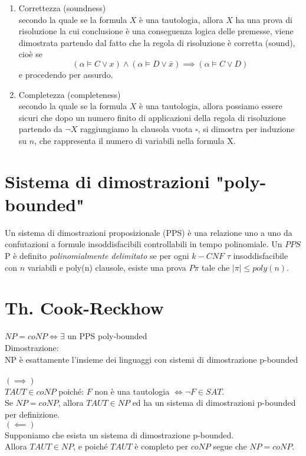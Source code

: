 \documentclass[it]{article}
\begin{document}
        \begin{enumerate}
            \item Correttezza (soundness)\\
            secondo la quale se la formula $ {\displaystyle X} $ è una tautologia, allora $ {\displaystyle X} $ ha una prova di risoluzione la cui conclusione è una conseguenza logica delle premesse, viene dimostrata partendo dal fatto che la regola di risoluzione è corretta (sound), cioè se
            $$ (\alpha \models C \lor x) \land (\alpha \models D \lor \bar{x}) \implies (\alpha \models C \lor D) $$
            e procedendo per assurdo.
            \item Completezza (completeness)\\
            secondo la quale se la formula $ {\displaystyle X} $ è una tautologia, allora possiamo essere sicuri che dopo un numero finito di applicazioni della regola di risoluzione partendo da $\lnot X$ raggiungiamo la clausola vuota $\square$, si dimostra per induzione su $ {\displaystyle n} $, che rappresenta il numero di variabili nella formula X.
        \end{enumerate}
    
    
\section{Sistema di dimostrazioni "poly-bounded"}
Un sistema di dimostrazioni proposizionale (PPS) è una relazione uno a uno da confutazioni a formule insoddisfacibili controllabili in tempo polinomiale.
Un $ {\displaystyle PPS}$ P è definito \emph{polinomialmente delimitato} se per ogni $ {\displaystyle k-CNF}$ $\tau$ insoddisfacibile con $ {\displaystyle n} $ variabili e poly(n) clausole, esiste una prova $ {\displaystyle P}  \pi$ tale che $|\pi| \leq poly(n)$.


\section{Th. Cook-Reckhow}
$ NP = coNP \iff \exists$ un PPS poly-bounded\\
Dimostrazione\cite{cook_reckhow_1979}:\\
NP è esattamente l'insieme dei linguaggi con sistemi di dimostrazione p-bounded \\\\
$(\implies)$\\ 
$TAUT \in coNP$ poiché: ${\displaystyle F}$ non è una tautologia $\iff \lnot F \in SAT$.\\
Se $NP = coNP$, allora $TAUT \in NP$ ed ha un sistema di dimostrazioni p-bounded per definizione.\\
$(\impliedby)$\\ 
Supponiamo che esista un sistema di dimostrazione p-bounded. \\
Allora $TAUT \in NP$, e poiché ${\displaystyle TAUT}$ è completo per ${\displaystyle coNP}$ segue che $NP = coNP$.
\end{document}
